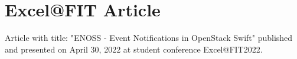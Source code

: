 

\chapter{Excel@FIT Article}
Article with title: "ENOSS - Event Notifications in OpenStack Swift" published and presented on April 30, 2022 at student conference Excel@FIT2022.

